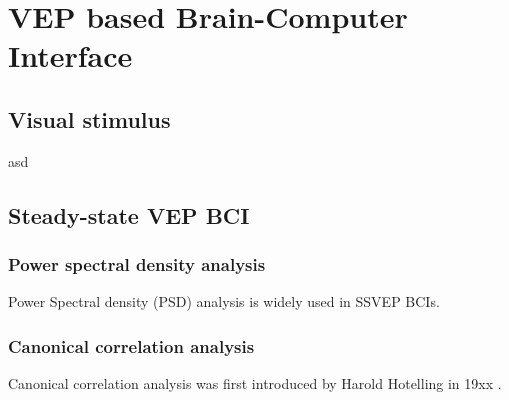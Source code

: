 
\chapter{VEP based Brain-Computer Interface}
\section{Visual stimulus}
asd
\section{Steady-state VEP BCI}
\subsection{Power spectral density analysis}
Power Spectral density (PSD) analysis is widely used in SSVEP BCIs\cite{bin2009cca}.
\subsection{Canonical correlation analysis}
Canonical correlation analysis was first introduced by Harold Hotelling in 19xx .